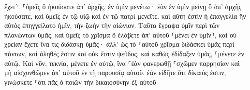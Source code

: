 \documentclass{openreader}
\begin{document}
ἔχει⸃. ⸀ὑμεῖς ὃ ἠκούσατε ἀπ’ ἀρχῆς, ἐν ὑμῖν μενέτω· ἐὰν ἐν ὑμῖν μείνῃ ὃ ἀπ’ ἀρχῆς ἠκούσατε, καὶ ὑμεῖς ἐν τῷ υἱῷ καὶ ἐν τῷ πατρὶ μενεῖτε. καὶ αὕτη ἐστὶν ἡ ἐπαγγελία ἣν αὐτὸς ἐπηγγείλατο ἡμῖν, τὴν ζωὴν τὴν αἰώνιον. Ταῦτα ἔγραψα ὑμῖν περὶ τῶν πλανώντων ὑμᾶς. καὶ ὑμεῖς τὸ χρῖσμα ὃ ἐλάβετε ἀπ’ αὐτοῦ ⸂μένει ἐν ὑμῖν⸃, καὶ οὐ χρείαν ἔχετε ἵνα τις διδάσκῃ ὑμᾶς· ἀλλ’ ὡς τὸ ⸀αὐτοῦ χρῖσμα διδάσκει ὑμᾶς περὶ πάντων, καὶ ἀληθές ἐστιν καὶ οὐκ ἔστιν ψεῦδος, καὶ καθὼς ἐδίδαξεν ὑμᾶς, ⸀μένετε ἐν αὐτῷ. Καὶ νῦν, τεκνία, μένετε ἐν αὐτῷ, ἵνα ⸀ἐὰν φανερωθῇ ⸀σχῶμεν παρρησίαν καὶ μὴ αἰσχυνθῶμεν ἀπ’ αὐτοῦ ἐν τῇ παρουσίᾳ αὐτοῦ. ἐὰν εἰδῆτε ὅτι δίκαιός ἐστιν, γινώσκετε ⸀ὅτι πᾶς ὁ ποιῶν τὴν δικαιοσύνην ἐξ αὐτοῦ 
\end{document}
